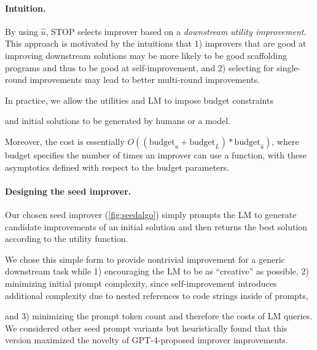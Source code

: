 \documentclass{article}
\newcommand{\metautil}{{\hat{u}}}
\begin{document}
\paragraph{Intuition.} By using $\metautil$, STOP selects improver based on a \textit{downstream utility improvement}. This approach is motivated by the intuitions that 1) improvers that are good at improving downstream solutions may be more likely to be good scaffolding programs and thus to be good at self-improvement, and 2) selecting for single-round improvements may lead to better multi-round improvements. 










 





In practice, we allow the utilities and LM to impose budget constraints

and initial solutions to be generated by humans or a model. 




Moreover, the cost is essentially $O((\mathrm{budget}_u + \mathrm{budget}_{L}) * \mathrm{budget}_\metautil)$, where budget specifies the number of times an improver can use a function, with these asymptotics defined with respect to the budget parameters.



\paragraph{Designing the seed improver.}
Our chosen seed improver (\cref{fig:seedalgo}) simply prompts the LM to generate candidate improvements of an initial solution and then returns the best solution according to the utility function. 







We chose this simple form to provide nontrivial improvement for a generic downstream task while 1) encouraging the LM to be as ``creative'' as possible, 2) minimizing initial prompt complexity, since self-improvement introduces additional complexity due to nested references to code strings inside of prompts, 

and 3) minimizing the prompt token count and therefore the costs of LM queries. 
We considered other seed prompt variants but heuristically found that this version maximized the novelty of GPT-4-proposed improver improvements. \vspace{-1px}
\end{document}
